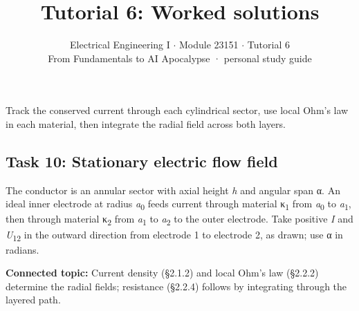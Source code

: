 \documentclass[11pt]{article}
\title{\sffamily\bfseries\color{FAUblue}Tutorial 6: Worked solutions}
\author{Electrical Engineering I \ensuremath{\cdot} Module 23151 \ensuremath{\cdot} Tutorial 6\\[2pt]\small From Fundamentals to AI Apocalypse · personal study guide}
\date{}
\begin{document}
\maketitle
\begingroup\footnotesize\setlength{\parskip}{0pt}\tableofcontents\endgroup
\clearpage

{\large Track the conserved current through each cylindrical sector, use local Ohm’s law in each material, then integrate the radial field across both layers.}


\begin{keepsection}
\section{Task 10: Stationary electric flow field}

The conductor is an annular sector with axial height \textit{h} and angular span α. An ideal inner electrode at radius \textit{a}\textsubscript{0} feeds current through material κ\textsubscript{1} from \textit{a}\textsubscript{0} to \textit{a}\textsubscript{1}, then through material κ\textsubscript{2} from \textit{a}\textsubscript{1} to \textit{a}\textsubscript{2} to the outer electrode. Take positive \textit{I} and \textit{U}\textsubscript{12} in the outward direction from electrode 1 to electrode 2, as drawn; use α in radians.

\textbf{Connected topic:} Current density (§2.1.2) and local Ohm’s law (§2.2.2) determine the radial fields; resistance (§2.2.4) follows by integrating through the layered path.


\end{keepsection}
\end{document}
